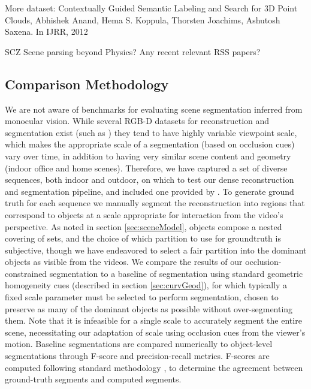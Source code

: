 More dataset: Contextually Guided Semantic Labeling and Search for 3D Point Clouds, Abhishek Anand, Hema S. Koppula, Thorsten Joachims, Ashutosh Saxena. In IJRR, 2012

SCZ Scene parsing beyond Physics? Any recent relevant RSS papers?
\fi

\subsection{Comparison Methodology}\label{sec:comparison}
We are not aware of benchmarks for evaluating scene segmentation inferred
from monocular vision. While several RGB-D datasets for reconstruction and 
segmentation exist (such as \cite{xiao2013sun3d, Silberman:ECCV12, sturm12iros, anand2012contextually}) they
tend to have highly variable viewpoint scale, which makes the appropriate scale of a segmentation (based on occlusion cues) vary over time, in addition to having very similar scene content and geometry (indoor office and home scenes).
Therefore, we have captured a set of diverse sequences, both indoor and outdoor, 
on which to test our dense reconstruction and
segmentation pipeline, and included one provided by \cite{Graber2011}.
To generate ground truth for each sequence we manually segment the reconstruction into regions 
that correspond to objects at a scale appropriate for interaction from the video's perspective. As noted in section \ref{sec:sceneModel}, objects compose a nested
covering of sets, and the choice of which partition to use for groundtruth is subjective, though we have endeavored to select a fair partition into the
dominant objects as visible from the videos.
We compare the results of our occlusion-constrained segmentation to a baseline of segmentation using standard geometric homogeneity cues (described in section
\ref{sec:curvGeod}), for which typically a fixed scale parameter must be selected to perform
segmentation, chosen to preserve as many of the dominant objects as possible without over-segmenting them. 
Note that it is infeasible for a single scale to accurately segment the entire scene, necessitating 
our adaptation of scale using occlusion cues from the viewer's motion.
Baseline segmentations are compared numerically to object-level segmentations through F-score
and precision-recall metrics. F-scores are computed following standard methodology \cite{OB14b},
to determine the agreement between ground-truth segments and computed segments.

